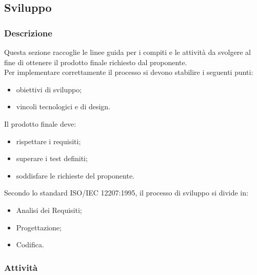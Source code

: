 \subsection{Sviluppo}

	\subsubsection{Descrizione}
	Questa sezione raccoglie le linee guida per i compiti e le attività da svolgere al fine di ottenere il prodotto finale richiesto dal proponente. \\
	Per implementare correttamente il processo si devono stabilire i seguenti punti:
	\begin{itemize}
		\item obiettivi di sviluppo;
		\item vincoli tecnologici e di design.
	\end{itemize}
	Il prodotto finale deve:
	\begin{itemize}
		\item rispettare i requisiti;
		\item superare i test definiti;
		\item soddisfare le richieste del proponente.
	\end{itemize}
	Secondo lo standard ISO/IEC 12207:1995, il processo di sviluppo si divide in:
	\begin{itemize}
		\item Analisi dei Requisiti;
		\item Progettazione;
		\item Codifica.
	\end{itemize}

	\subsubsection{Attività}

